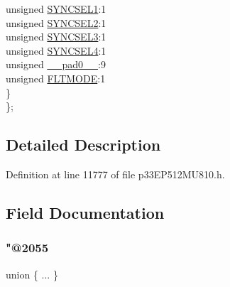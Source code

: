 \begin{DoxyCompactItemize}
\begin{tabbing}
\>\>unsigned \hyperlink{structtag_o_c10_c_o_n2_b_i_t_s_a50e73f95ab1c258ddc64f69c0991deaf}{SYNCSEL1}:1\\
\>\>unsigned \hyperlink{structtag_o_c10_c_o_n2_b_i_t_s_a304907a5d2c4cbf1114a54642a85951e}{SYNCSEL2}:1\\
\>\>unsigned \hyperlink{structtag_o_c10_c_o_n2_b_i_t_s_a6bbd1bd2ead6c9fa713969c6eb0f0c75}{SYNCSEL3}:1\\
\>\>unsigned \hyperlink{structtag_o_c10_c_o_n2_b_i_t_s_a0cd5bbe196c7974953909d27a6307bb7}{SYNCSEL4}:1\\
\>\>unsigned \hyperlink{structtag_o_c10_c_o_n2_b_i_t_s_adf71f3d8410c1f1dbbc96680a92c49af}{\_\_pad0\_\_}:9\\
\>\>unsigned \hyperlink{structtag_o_c10_c_o_n2_b_i_t_s_ad53c2a5303780172219bfd5e0100c782}{FLTMODE}:1\\
\>\} \\
\}; \\

\end{tabbing}\end{DoxyCompactItemize}


\subsection{Detailed Description}


Definition at line 11777 of file p33\+E\+P512\+M\+U810.\+h.



\subsection{Field Documentation}
\mbox{\label{structtag_o_c10_c_o_n2_b_i_t_s_a2f5af003ba64cbb31460c4514c470e55}} 
\subsubsection{\texorpdfstring{"@2055}{@2055}}
{\footnotesize\ttfamily union \{ ... \} }

\mbox{\label{structtag_o_c10_c_o_n2_b_i_t_s_adf71f3d8410c1f1dbbc96680a92c49af}} 
